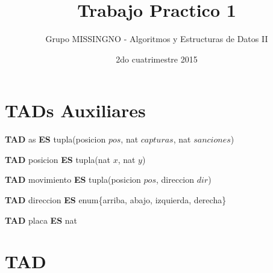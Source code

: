 \documentclass[10pt, a4paper]{article}
\author{Grupo MISSINGNO - Algoritmos y Estructuras de Datos II}
\date{2do cuatrimestre 2015}
\title{Trabajo Practico 1}
\begin{document}
\thispagestyle{empty}

\maketitle
\tableofcontents

\newpage

\section{TADs Auxiliares}
\par \textbf{TAD} as \textbf{ES} tupla(posicion $pos$, nat $capturas$, nat $sanciones$)
\par \textbf{TAD} posicion \textbf{ES} tupla(nat $x$, nat $y$)
\par \textbf{TAD} movimiento \textbf{ES} tupla(posicion $pos$, direccion $dir$)
\par \textbf{TAD} direccion \textbf{ES} enum\{arriba, abajo, izquierda, derecha\}
\par \textbf{TAD} placa \textbf{ES} nat

\section{TAD }
\end{document}
